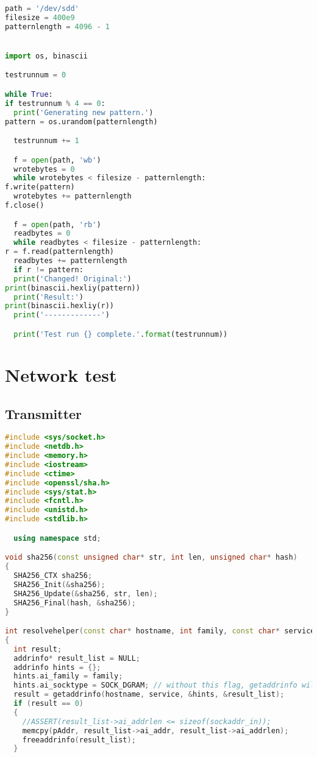 \begin{appendices}
\begin{lstlisting}[language=Python]
path = '/dev/sdd'
filesize = 400e9
patternlength = 4096 - 1


import os, binascii

testrunnum = 0

while True:
if testrunnum % 4 == 0:
  print('Generating new pattern.')
pattern = os.urandom(patternlength)

  testrunnum += 1

  f = open(path, 'wb')
  wrotebytes = 0
  while wrotebytes < filesize - patternlength:
f.write(pattern)
  wrotebytes += patternlength
f.close()

  f = open(path, 'rb')
  readbytes = 0
  while readbytes < filesize - patternlength:
r = f.read(patternlength)
  readbytes += patternlength
  if r != pattern:
  print('Changed! Original:')
print(binascii.hexliy(pattern))
  print('Result:')
print(binascii.hexliy(r))
  print('-------------')

  print('Test run {} complete.'.format(testrunnum))
  \end{lstlisting}

  \section{Network test}\label{Apdx-network}
  \subsection{Transmitter}
  \begin{lstlisting}[language=C++]
#include <sys/socket.h>
#include <netdb.h>
#include <memory.h>
#include <iostream>
#include <ctime>
#include <openssl/sha.h>
#include <sys/stat.h>
#include <fcntl.h>
#include <unistd.h>
#include <stdlib.h>

  using namespace std;

void sha256(const unsigned char* str, int len, unsigned char* hash)
{
  SHA256_CTX sha256;
  SHA256_Init(&sha256);
  SHA256_Update(&sha256, str, len);
  SHA256_Final(hash, &sha256);
}

int resolvehelper(const char* hostname, int family, const char* service, sockaddr_storage* pAddr)
{
  int result;
  addrinfo* result_list = NULL;
  addrinfo hints = {};
  hints.ai_family = family;
  hints.ai_socktype = SOCK_DGRAM; // without this flag, getaddrinfo will return 3x the number of addresses (one for each socket type).
  result = getaddrinfo(hostname, service, &hints, &result_list);
  if (result == 0)
  {
    //ASSERT(result_list->ai_addrlen <= sizeof(sockaddr_in));
    memcpy(pAddr, result_list->ai_addr, result_list->ai_addrlen);
    freeaddrinfo(result_list);
  }


\end{lstlisting}
\end{appendices}
